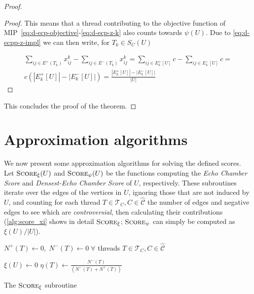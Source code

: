 \begin{proof}
\begin{proof}
		This means that a thread contributing to the objective function of
		MIP~\ref{eq:d-ecp-objective}-\ref{eq:d-ecp-z-k} also counts towards
		$\psi(U)$. Due to \autoref{eq:d-ecpp-z-impl} we can then write, for
		$T_k \in S_C(U)$

		\begin{multline*}
			\sum^{}_{ij \in E^{+} (T_{k})} x_{ij} ^{k} - \sum_{ij \in E^{-}
				(T_{k})} x_{ij} ^{k} = \sum^{}_{ij \in E^{+}_k[U] } c - \sum_{ij \in E^{-}
			_k[U]} c = \\ c (|E^{+}_{k}[U]| - |E^{-}_{k}[U]|) =
			\frac{|E^{+}_{k}[U]| - |E^{-}_{k}[U]|}{|U|}
		\end{multline*}
	\end{proof}

	This concludes the proof of the theorem.

\end{proof}

\clearpage

\section{Approximation algorithms}%
\label{sub:approximation_algorithms}

We now present some approximation algorithms for solving the defined scores.
Let $\textsc{Score}_{\xi} (U)$ and $\textsc{Score}_{\psi} (U)$ be the functions computing the
\emph{Echo Chamber Score} and \emph{Densest-Echo Chamber Score} of $U$,
respectively. These subroutines iterate over the edges of the vertices in $U$,
ignoring those that are not induced by $U$, and counting for each thread $T \in
	\mathcal{T}_{C}, C \in \mathcal{\hat{C}} $ the number of edges and negative edges
to see which are \emph{controversial}, then calculating their contributions
(\autoref{alg:score_xi} shows in detail $\textsc{Score}_\xi$;
$\textsc{Score}_\psi$ can simply be computed as $\xi(U)/|U|$).

\begin{algorithm}
	\SetAlgoLined
	$N^{+} (T) \leftarrow 0, \; N^{-} (T) \leftarrow 0\; \forall $ threads $T
		\in \mathcal{T}_{C}, C \in \mathcal{\hat{C}}   $ \;


	$\xi(U) \leftarrow 0$ \;
	$\eta(T) \leftarrow\frac{N^{-}(T)}{(N^{-}(T) + N^{+} (T))}$ \;

	\caption{The $\textsc{Score}_{\xi}  $ subroutine}
	\label{alg:score_xi}
\end{algorithm}

